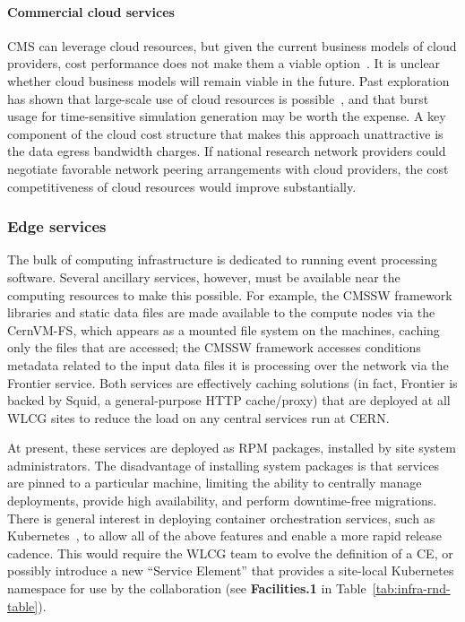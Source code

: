 \paragraph{Commercial cloud services}
CMS can leverage cloud resources, but given the current business models of cloud providers, cost performance does not make them a viable option~\cite{Holzman_2017,ATLAS:2024gjt}. It is unclear whether cloud business models will remain viable in the future. Past exploration has shown that large-scale use of cloud resources is possible~\cite{Google-cloud-CERN}, and that burst usage for time-sensitive simulation generation may be worth the expense. A key component of the cloud cost structure that makes this approach unattractive is the data egress bandwidth charges. If national research network providers could negotiate favorable network peering arrangements with cloud providers, the cost competitiveness of cloud resources would improve substantially.

\subsubsection{Edge services}
\label{sec:edge-services}

The bulk of computing infrastructure is dedicated to running event processing software. Several ancillary services, however, must be available near the computing resources to make this possible. For example, the \gls{CMSSW} framework libraries and static data files are made available to the compute nodes via the \gls{CernVM-FS}, which appears as a mounted file system on the machines, caching only the files that are accessed; the \gls{CMSSW} framework accesses conditions metadata related to the input data files it is processing over the network via the Frontier service. Both services are effectively caching solutions (in fact, Frontier is backed by Squid, a general-purpose HTTP cache/proxy) that are deployed at all \gls{WLCG} sites to reduce the load on any central services run at CERN.

At present, these services are deployed as \gls{RPM} packages, installed by site system administrators. The disadvantage of installing system packages is that services are pinned to a particular machine, limiting the ability to centrally manage deployments, provide high availability, and perform downtime-free migrations. There is general interest in deploying container orchestration services, such as Kubernetes~\cite{kubernetes}, to allow all of the above features and enable a more rapid release cadence. This would require the \gls{WLCG} team to evolve the definition of a \gls{CE}, or possibly introduce a new ``Service Element'' that provides a site-local Kubernetes namespace for use by the collaboration (see \textbf{Facilities.1} in Table~\ref{tab:infra-rnd-table}).

